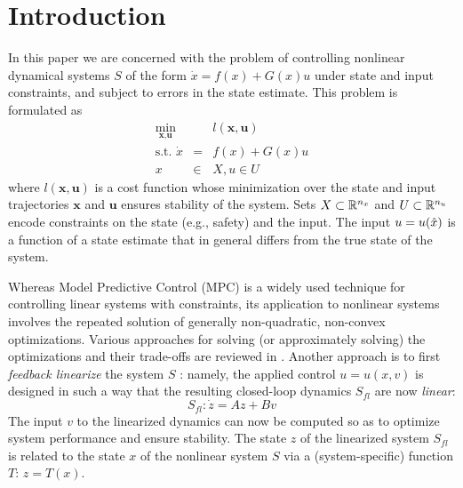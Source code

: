 \section{Introduction}
\label{sec:intro}

In this paper we are concerned with the problem of controlling nonlinear dynamical systems $S$ of the form $\dot{x} = f(x) + G(x)u$ under state and input constraints, and subject to errors in the state estimate.
This problem is formulated as
\begin{eqnarray}
	\label{eq:generic NLMPC}
	\min_{\textbf{x},\textbf{u}} &\;& l(\textbf{x}, \textbf{u}) \\
	\text{s.t. } \dot{x}&=&f(x) + G(x)u \nonumber \\
	x&\in& X, u \in U  \nonumber
\end{eqnarray}
where $l(\textbf{x}, \textbf{u})$ is a cost function whose minimization over the state and input trajectories $\textbf{x}$ and $\textbf{u}$ ensures stability of the system. 
Sets $X \subset \mathbb{R}^{n_x}$ and $ U \subset \mathbb{R}^{n_u}$ encode constraints on the state (e.g., safety) and the input.
The input $u = u(\hat{x})$ is a function of a state estimate that in general differs from the true state of the system.

Whereas Model Predictive Control (MPC) is a widely used technique for controlling linear systems with constraints, its application to nonlinear systems involves the repeated solution of generally non-quadratic, non-convex optimizations.
Various approaches for solving (or approximately solving) the optimizations and their trade-offs are reviewed in \cite{Cannon04_EfficientMPC}.
Another approach is to first \emph{feedback linearize} the system $S$ \cite{khalil}: namely, the applied control $u = u(x,v)$ is designed in such a way that the resulting closed-loop dynamics $S_{fl}$ are now \emph{linear}:
	\[S_{fl}: \dot{z} = Az + Bv\]
The input $v$ to the linearized dynamics can now be computed so as to optimize system performance and ensure stability.
The state $z$ of the linearized system $S_{fl}$ is related to the state $x$ of the nonlinear system $S$ via a (system-specific) function $T$: $z=T(x)$.


